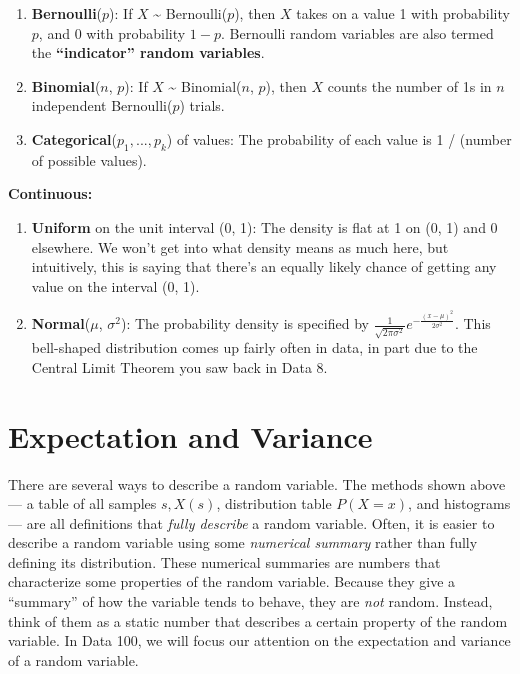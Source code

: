 \documentclass[
  letterpaper,
  DIV=11,
  numbers=noendperiod]{scrreprt}
\providecommand{\tightlist}{%
  \setlength{\itemsep}{0pt}\setlength{\parskip}{0pt}}\usepackage{longtable,booktabs,array}
\begin{document}
\begin{enumerate}
\def\labelenumi{\arabic{enumi}.}
\tightlist
\item
  \textbf{Bernoulli}(\(p\)): If \(X\) \textasciitilde{}
  Bernoulli(\(p\)), then \(X\) takes on a value 1 with probability
  \(p\), and 0 with probability \(1 - p\). Bernoulli random variables
  are also termed the \textbf{``indicator'' random variables}.
\item
  \textbf{Binomial}(\(n\), \(p\)): If \(X\) \textasciitilde{}
  Binomial(\(n\), \(p\)), then \(X\) counts the number of 1s in \(n\)
  independent Bernoulli(\(p\)) trials.
\item
  \textbf{Categorical}(\(p_1, ..., p_k\)) of values: The probability of
  each value is 1 / (number of possible values).
\end{enumerate}

\textbf{Continuous:}

\begin{enumerate}
\def\labelenumi{\arabic{enumi}.}
\tightlist
\item
  \textbf{Uniform} on the unit interval (0, 1): The density is flat at 1
  on (0, 1) and 0 elsewhere. We won't get into what density means as
  much here, but intuitively, this is saying that there's an equally
  likely chance of getting any value on the interval (0, 1).
\item
  \textbf{Normal}(\(\mu\), \(\sigma^2\)): The probability density is
  specified by
  \(\frac{1}{\sqrt{2\pi\sigma^2}}e^{-\frac{(x-\mu)^2}{2\sigma^2}}\).
  This bell-shaped distribution comes up fairly often in data, in part
  due to the Central Limit Theorem you saw back in Data 8.
\end{enumerate}

\section{Expectation and Variance}\label{expectation-and-variance}

There are several ways to describe a random variable. The methods shown
above --- a table of all samples \(s, X(s)\), distribution table
\(P(X=x)\), and histograms --- are all definitions that \emph{fully
describe} a random variable. Often, it is easier to describe a random
variable using some \emph{numerical summary} rather than fully defining
its distribution. These numerical summaries are numbers that
characterize some properties of the random variable. Because they give a
``summary'' of how the variable tends to behave, they are \emph{not}
random. Instead, think of them as a static number that describes a
certain property of the random variable. In Data 100, we will focus our
attention on the expectation and variance of a random variable.
\end{document}
